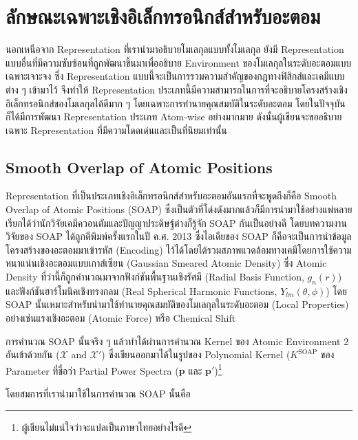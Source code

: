 \section{ลักษณะเฉพาะเชิงอิเล็กทรอนิกส์สำหรับอะตอม}

นอกเหนือจาก Representation ที่เรานำมาอธิบายโมเลกุลแบบทั้งโมเลกุล ยังมี Representation แบบอื่นที่มีความซับซ้อนที่ถูกพัฒนาขึ้นมาเพื่ออธิบาย
Environment ของโมเลกุลในระดับอะตอมแบบเฉพาะเจาะจง ซึ่ง Representation แบบนี้จะเป็นการรวมความสำคัญของกฎทางฟิสิกส์และเคมีแบบต่าง ๆ เข้ามาไว้
จึงทำให้ Representation ประเภทนี้มีความสามารถในการที่จะอธิบายโครงสร้างเชิงอิเล็กทรอนิกส์ของโมเลกุลได้ดีมาก ๆ โดยเฉพาะการทำนายคุณสมบัติในระดับอะตอม
โดยในปัจจุบันก็ได้มีการพัฒนา Representation ประเภท Atom-wise อย่างมากมาย ดังนั้นผู้เขียนจะขออธิบายเฉพาะ Representation ที่มีความโดดเด่นและเป็นที่นิยมเท่านั้น

\subsection{Smooth Overlap of Atomic Positions}

Representation ที่เป็นประเภทเชิงอิเล็กทรอนิกส์สำหรับอะตอมอันแรกที่จะพูดถึงก็คือ Smooth Overlap of Atomic Positions (SOAP) 
ซึ่งเป็นตัวที่โด่งดังมากแล้วก็มีการนำมาใช้อย่างแพ่หลาย เรียกได้ว่านักวิจัยเคมีควอนตัมและปัญญาประดิษฐ์ต่างก็รู้จัก SOAP กันเป็นอย่างดี
โดยบทความงานวิจัยของ SOAP ได้ถูกตีพิมพ์ครั้งแรกในปี ค.ศ. 2013 ซึ่งไอเดียของ SOAP ก็คือจะเป็นการนำข้อมูลโครงสร้างของอะตอมมาเข้ารหัส (Encoding) 
ไว้ได้โดยได้รวมสภาพแวดล้อมทางเคมีโดยการใช้ความหนาแน่นเชิงอะตอมแบบเกาส์เซียน (Gaussian Smeared Atomic Density) 
ซึ่ง Atomic Density ที่ว่านี้ก็ถูกคำนวณมาจากฟังก์ชันพื้นฐานเชิงรัศมี (Radial Basis Function, $g_{n}(r)$) และฟังก์ชันฮาร์โมนิคเชิงทรงกลม 
(Real Spherical Harmonic Functions, $Y_{lm}(\theta, \phi)$)\cite{bartok2013,de2016}
โดย SOAP นั้นเหมาะสำหรับนำมาใช้ทำนายคุณสมบัติของโมเลกุลในระดับอะตอม (Local Properties) อย่างเช่นแรงเชิงอะตอม (Atomic Force) หรือ Chemical Shift

การคำนวณ SOAP นั้นจริง ๆ แล้วทำได้ผ่านการคำนวณ Kernel ของ Atomic Environment 2 อันเข้าด้วยกัน ($\mathcal{X}$ and $\mathcal{X}'$)
ซึ่งเขียนออกมาได้ในรูปของ Polynomial Kernel ($K^\mathrm{SOAP}$ ของ Parameter ที่ชื่อว่า Partial Power Spectra 
($\mathbf{p}$ และ $\mathbf{p}'$)\footnote{ผู้เขียนไม่แน่ใจว่าจะแปลเป็นภาษาไทยอย่างไรดี} 

โดยสมการที่เรานำมาใช้ในการคำนวณ SOAP นั้นคือ

